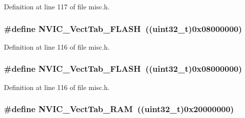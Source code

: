 Definition at line 117 of file misc.\+h.

\subsubsection[{\texorpdfstring{N\+V\+I\+C\+\_\+\+Vect\+Tab\+\_\+\+F\+L\+A\+SH}{NVIC_VectTab_FLASH}}]{\setlength{\rightskip}{0pt plus 5cm}\#define N\+V\+I\+C\+\_\+\+Vect\+Tab\+\_\+\+F\+L\+A\+SH~(({\bf uint32\+\_\+t})0x08000000)}\hypertarget{group___vector___table___base_gafbf92fd28a1090b2aa49732ebd5704b5}{}\label{group___vector___table___base_gafbf92fd28a1090b2aa49732ebd5704b5}


Definition at line 116 of file misc.\+h.

\subsubsection[{\texorpdfstring{N\+V\+I\+C\+\_\+\+Vect\+Tab\+\_\+\+F\+L\+A\+SH}{NVIC_VectTab_FLASH}}]{\setlength{\rightskip}{0pt plus 5cm}\#define N\+V\+I\+C\+\_\+\+Vect\+Tab\+\_\+\+F\+L\+A\+SH~(({\bf uint32\+\_\+t})0x08000000)}\hypertarget{group___vector___table___base_gafbf92fd28a1090b2aa49732ebd5704b5}{}\label{group___vector___table___base_gafbf92fd28a1090b2aa49732ebd5704b5}


Definition at line 116 of file misc.\+h.

\subsubsection[{\texorpdfstring{N\+V\+I\+C\+\_\+\+Vect\+Tab\+\_\+\+R\+AM}{NVIC_VectTab_RAM}}]{\setlength{\rightskip}{0pt plus 5cm}\#define N\+V\+I\+C\+\_\+\+Vect\+Tab\+\_\+\+R\+AM~(({\bf uint32\+\_\+t})0x20000000)}\hypertarget{group___vector___table___base_ga8be8181cc3e5d42f6204af306ab50f80}{}\label{group___vector___table___base_ga8be8181cc3e5d42f6204af306ab50f80}


